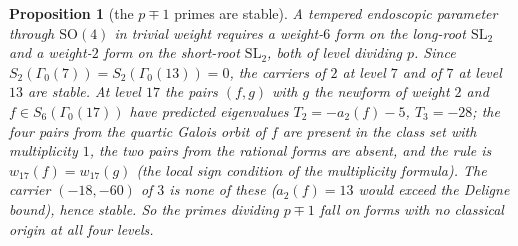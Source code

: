\documentclass[11pt]{amsart}
\newtheorem{proposition}[theorem]{Proposition}
\theoremstyle{definition}
\begin{document}
\begin{proposition}[the $p\mp1$ primes are stable]\label{prop:stable}
A tempered endoscopic parameter through $\mathrm{SO}(4)$ in trivial weight requires a weight-$6$ form on the long-root $\mathrm{SL}_2$ and a weight-$2$ form on the short-root $\mathrm{SL}_2$, both of level dividing $p$. Since $S_2(\Gamma_0(7))=S_2(\Gamma_0(13))=0$, the carriers of $2$ at level $7$ and of $7$ at level $13$ are stable. At level $17$ the pairs $(f,g)$ with $g$ the newform of weight $2$ and $f\in S_6(\Gamma_0(17))$ have predicted eigenvalues $T_2=-a_2(f)-5$, $T_3=-28$; the four pairs from the quartic Galois orbit of $f$ are present in the class set with multiplicity $1$, the two pairs from the rational forms are absent, and the rule is $w_{17}(f)=w_{17}(g)$ (the local sign condition of the multiplicity formula). The carrier $(-18,-60)$ of $3$ is none of these ($a_2(f)=13$ would exceed the Deligne bound), hence stable. So the primes dividing $p\mp1$ fall on forms with no classical origin at all four levels.
\end{proposition}
\end{document}
